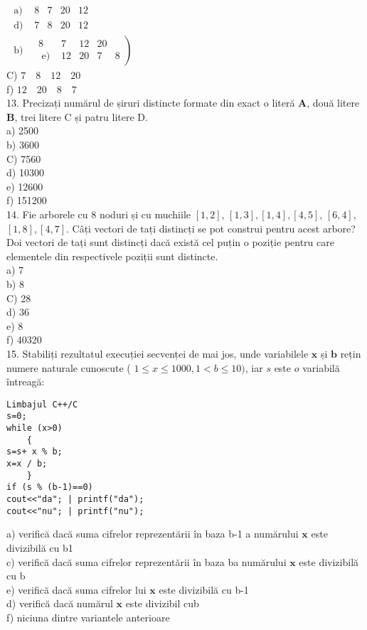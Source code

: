 $\begin{array}{lllll}\text { a) } & 8 & 7 & 20 & 12 \\ \text { d) } & 7 & 8 & 20 & 12\end{array}$\\
$\begin{array}{lllll}\text { b) } & \left.\begin{array}{lllll}8 & 7 & 12 & 20 \\ \text { e) } & 12 & 20 & 7 & 8\end{array}\right)\end{array}$\\
C) $7 \quad 8 \quad 12 \quad 20$\\
f) $12 \quad 20 \quad 8 \quad 7$\\
13. Precizați numărul de șiruri distincte formate din exact o literă $\mathbf{A}$, două litere $\mathbf{B}$, trei litere C și patru litere D.\\
a) 2500\\
b) 3600\\
C) 7560\\
d) 10300\\
e) 12600\\
f) 151200\\
14. Fie arborele cu 8 noduri și cu muchiile $[1,2]$, $[1,3],[1,4],[4,5]$, $[6,4]$, $[1,8],[4,7]$. Câți vectori de tați distincți se pot construi pentru acest arbore? Doi vectori de tați sunt distincți dacă există cel puțin o poziție pentru care elementele din respectivele poziții sunt distincte.\\
a) 7\\
b) 8\\
C) 28\\
d) 36\\
e) 8\\
f) 40320\\
15. Stabiliți rezultatul execuției secvenței de mai jos, unde variabilele $\mathbf{x}$ și $\mathbf{b}$ rețin numere naturale cunoscute ( $1 \leq x \leq 1000,1<b \leq 10)$, iar $s$ este $o$ variabilă întreagă:

\begin{verbatim}
Limbajul C++/C
s=0;
while (x>0)
    {
s=s+ x % b;
x=x / b;
    }
if (s % (b-1)==0)
cout<<"da"; | printf("da");
cout<<"nu"; | printf("nu");
\end{verbatim}

a) verifică dacă suma cifrelor reprezentării în baza b-1 a numărului $\mathbf{x}$ este divizibilă cu b1\\
c) verifică dacă suma cifrelor reprezentării în baza ba numărului $\mathbf{x}$ este divizibilă cu b\\
e) verifică dacă suma cifrelor lui $\mathbf{x}$ este divizibilă cu b-1\\
d) verifică dacă numărul $\mathbf{x}$ este divizibil cub\\
f) niciuna dintre variantele anterioare

